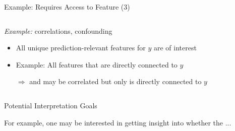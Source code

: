 \documentclass[10pt,compress,t,notes=noshow, xcolor=table]{beamer}
\begin{document}
\begin{frame}{Example: Requires Access to Feature (3)}
\begin{columns}[T, totalwidth=\textwidth]
\begin{column}{0.48\textwidth}
   \textit{Example:} correlations, confounding
  
  \pause
      \begin{itemize}
      \item All unique prediction-relevant features for $y$ are of interest
      \item Example: All features that are directly connected to $y$
      \item[$\Rightarrow$]  and  may be correlated but only  is directly connected to $y$
  \end{itemize}
  \end{column}
\end{columns}  
\end{frame}


\begin{frame}{Potential Interpretation Goals}


For example, one may be interested in getting insight into whether the ...


\end{frame}
\end{document}
